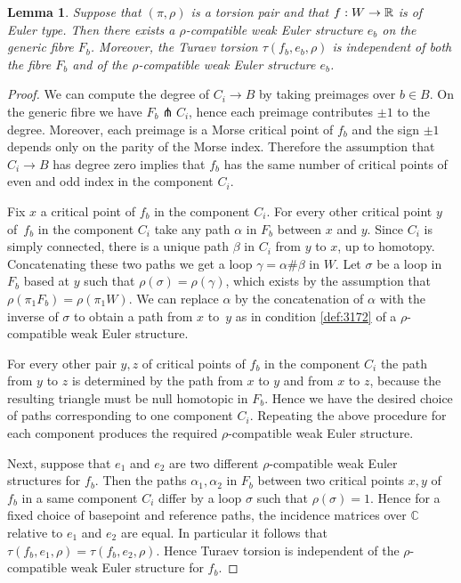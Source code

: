 \documentclass[11pt]{article}
\numberwithin{equation}{section}\providecommand{\dpl}{\displaystyle}
\theoremstyle{plain}
\newtheorem{lemma}[theorem]{Lemma}
\theoremstyle{definition}
\newcommand{\bC}{\mathbb{C}}\newcommand{\bD}{\mathbb{D}}
\begin{document}
\begin{lemma}\label{familyturaev}
Suppose that $(\pi, \rho)$ is a torsion pair and that $f:W \to \mathbb{R}$ is of Euler type. Then there exists a $\rho$-compatible weak Euler structure $e_b$ on the generic fibre $F_b$. Moreover, the Turaev torsion $\tau(f_b,e_b, \rho)$ is independent of both the fibre $F_b$ and of the $\rho$-compatible weak Euler structure $e_b$.
\end{lemma}

\begin{proof} We can compute the degree of $C_i \to B$ by taking preimages over $b \in B$. On the generic fibre we have $F_b \pitchfork C_i$, hence each preimage contributes $\pm 1$ to the degree. Moreover, each preimage is a Morse critical point of $f_b$ and the sign $\pm 1$ depends only on the parity of the Morse index. Therefore the assumption that $C_i \to B$ has degree zero implies that $f_b$ has the same number of critical points of even and odd index in the component $C_i$.

Fix $x$ a critical point of $f_b$ in the component $C_i$. For every other critical point $y$ of~$f_b$ in the component $C_i$ take any path $\alpha$ in $F_b$ between $x$ and $y$. Since $C_i$ is simply connected, there is a unique path $\beta$ in $C_i$ from $y$ to $x$, up to homotopy. Concatenating these two paths we get a loop $\gamma = \alpha \# \beta$ in $W$. Let $\sigma$ be a loop in $F_b$ based at $y$ such that $\rho(\sigma)=\rho(\gamma)$, which exists by the assumption that $\rho(\pi_1F_b)=\rho(\pi_1W)$. We can replace $\alpha$ by the concatenation of $\alpha$ with the inverse of $\sigma$ to obtain a path from $x$ to~$y$ as in condition \eqref{def:3172} of a $\rho$-compatible weak Euler structure.

For every other pair $y,z$ of critical points of $f_b$ in the component $C_i$ the path from $y$ to $z$ is determined by the path from $x$ to $y$ and from $x$ to $z$, because the resulting triangle must be null homotopic in $F_b$. Hence we have the desired choice of paths corresponding to one component $C_i$. Repeating the above procedure for each component produces the required $\rho$-compatible weak Euler structure.

Next, suppose that $e_1$ and $e_2$ are two different $\rho$-compatible weak Euler structures for $f_b$. Then the paths $\alpha_1, \alpha_2$ in $F_b$ between two critical points $x,y$ of $f_b$ in a same component $C_i$ differ by a loop $\sigma$ such that $\rho(\sigma)=1$. Hence for a fixed choice of basepoint and reference paths, the incidence matrices over $\bC$ relative to $e_1$ and $e_2$ are equal. In particular it follows that $\tau(f_b,e_1,\rho)=\tau(f_b, e_2, \rho)$. Hence Turaev torsion is independent of the $\rho$-compatible weak Euler structure for $f_b$.


\end{proof}
\end{document}
